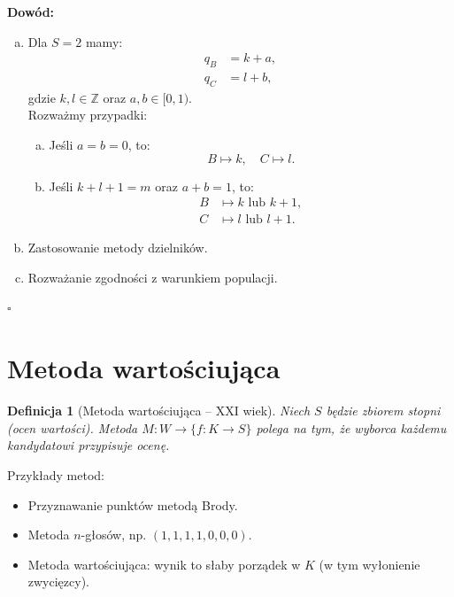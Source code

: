 \documentclass[12pt,a4paper]{article}
\theoremstyle{break}
\newtheorem{definition}{Definicja}[section]
\begin{document}
	\noindent \textbf{Dowód:}
	\begin{enumerate}[a)]
		\item Dla $S = 2$ mamy:
		\begin{align*}
			q_B &= k + a, \\
			q_C &= l + b,
		\end{align*}
		gdzie $k, l \in \mathbb{Z}$ oraz $a, b \in [0, 1)$. \\
		Rozważmy przypadki:
		\begin{enumerate}[a)]
			\item Jeśli $a = b = 0$, to:
			\[
			B \mapsto k, \quad C \mapsto l.
			\]
			\item Jeśli $k + l + 1 = m$ oraz $a + b = 1$, to:
			\begin{align*}
				B &\mapsto k \text{ lub } k+1, \\
				C &\mapsto l \text{ lub } l+1.
			\end{align*}
		\end{enumerate}
		
		\item Zastosowanie metody dzielników.
		
		\item Rozważanie zgodności z warunkiem populacji.
	\end{enumerate}
	
	\begin{flushright}
		$\square$
	\end{flushright}
	
	\newpage
	
	\section{Metoda wartościująca}
	
	\begin{definition}[Metoda wartościująca -- XXI wiek]
		Niech $S$ będzie zbiorem stopni (ocen wartości). Metoda $M: W \to \{ f: K \to S \}$ polega na tym, że wyborca każdemu kandydatowi przypisuje ocenę.
	\end{definition}
	
	\noindent Przykłady metod:
	\begin{itemize}
		\item Przyznawanie punktów metodą Brody.
		\item Metoda $n$-głosów, np. $(1,1,1,1,0,0,0)$.
		\item Metoda wartościująca: wynik to słaby porządek w $K$ (w tym wyłonienie zwycięzcy).
	\end{itemize}
	
\end{document}
